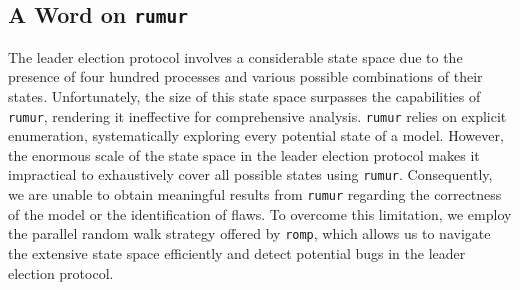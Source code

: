 \subsection{A Word on \texttt{rumur}}\label{subsec:a-word-on-rumur}

The leader election protocol involves a considerable state space due to the
presence of four hundred processes and various possible combinations of their
states.
Unfortunately, the size of this state space surpasses the capabilities of
\texttt{rumur}, rendering it ineffective for comprehensive analysis.
\texttt{rumur} relies on explicit enumeration, systematically exploring every
potential state of a model.
However, the enormous scale of the state space in the leader election
protocol makes it impractical to exhaustively cover all possible states using
\texttt{rumur}.
Consequently, we are unable to obtain meaningful results from \texttt{rumur}
regarding the correctness of the model or the identification of flaws.
To overcome this limitation, we employ the parallel random walk strategy
offered by \texttt{romp}, which allows us to navigate the extensive state
space efficiently and detect potential bugs in the leader election protocol.
